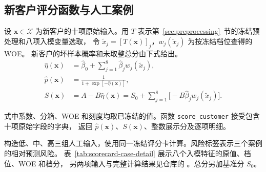 \begin{table}[!htbp]
  \centering
  \caption{完整评分卡}
  \label{tab:complete-scorecard}
  \scriptsize\linespread{1}\selectfont
  \setlength{\tabcolsep}{3pt}
  \renewcommand{\arraystretch}{0.96}
  
\end{table}

\subsection{新客户评分函数与人工案例}
设 $\boldsymbol{x}\in\mathcal X$ 为新客户的十项原始输入。用 $T$ 表示第~\ref{sec:preprocessing}~节的冻结预处理和八项入模变量选取，
令 $\widetilde{x}_j=[T(\boldsymbol{x})]_j$，$w_j(\widetilde{x}_j)$ 为按冻结档位查得的 WOE。
新客户的坏样本概率和未取整总分由下式给出。
\begin{equation}
  \begin{aligned}
    \widehat\eta(\boldsymbol{x})&=\widehat\beta_0+\sum_{j=1}^{8}\widehat\beta_j w_j(\widetilde{x}_j),\\
    \widehat p(\boldsymbol{x})&=\frac{1}{1+\exp[-\widehat\eta(\boldsymbol{x})]},\\
    S(\boldsymbol{x})&=A-B\widehat\eta(\boldsymbol{x})
      =S_0+\sum_{j=1}^{8}\bigl[-B\widehat\beta_j w_j(\widetilde{x}_j)\bigr].
  \end{aligned}
  \label{eq:score-new-customer}
\end{equation}

式中系数、分箱、WOE 和刻度均取已冻结的值。函数 \texttt{score\_customer} 接受包含十项原始字段的字典，
返回 $\widehat p(\boldsymbol{x})$、$S(\boldsymbol{x})$、整数展示分及逐项明细。

构造低、中、高三组人工输入，使用同一冻结评分卡计算。风险标签表示三个案例的相对预测风险。
表~\ref{tab:scorecard-case-detail} 展示八个入模特征的原值、档位、WOE 和档分，
另两项输入与完整计算结果见仓库的 。总分另加基准分 $S_0$。

